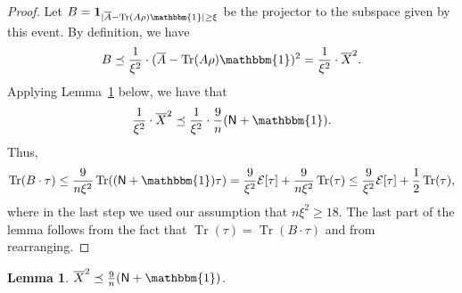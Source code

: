 \documentclass[10pt]{article}
\newcommand{\energy}{\mathcal{E}}
\DeclareMathOperator{\Tr}{Tr}
\newcommand{\Id}{\mathbbm{1}}
\newtheorem{lemma}[theorem]{Lemma}
\newcommand{\lift}[1]{\overline{#1}}
\begin{document}
\begin{proof}
    Let $B = \mathbf{1}_{|\lift{A} - \Tr(A\rho)\Id|\ge \xi}$ be the projector to the subspace given by this event.
    By definition, we have
    \begin{equation*}
        B
        \preceq \frac{1}{\xi^2} 
        \cdot (\lift{A} - \Tr(A\rho)\Id)^2
        = \frac{1}{\xi^2} 
        \cdot \lift{X}^2.
    \end{equation*}
    Applying Lemma~\ref{lem:NI} below, we have that
    \begin{equation*}
        \frac{1}{\xi^2} 
        \cdot \lift{X}^2
        \preceq \frac{1}{\xi^2} 
        \cdot \frac{9}{n}(\mathsf{N} + \Id).
    \end{equation*}
    Thus,
    \begin{equation*}
        \Tr(B \cdot \tau)
        \leq \frac{9}{n \xi^2} \Tr((\mathsf{N} + \Id) \tau)
        = \frac{9}{\xi^2} \energy[\tau]
        + \frac{9}{n \xi^2} \Tr(\tau)
        \leq \frac{9}{\xi^2} \energy[\tau]
        + \frac{1}{2} \Tr(\tau),
    \end{equation*}
    where in the last step we used our assumption that $n \xi^2 \geq 18$.
    The last part of the lemma follows from the fact that $\Tr(\tau) = \Tr(B\cdot \tau)$ and from rearranging.
\end{proof}

\begin{lemma}\label{lem:NI}
    $\lift{X}^2 \preceq \frac{9}{n}(\mathsf{N} + \Id)$.
\end{lemma}
\end{document}

